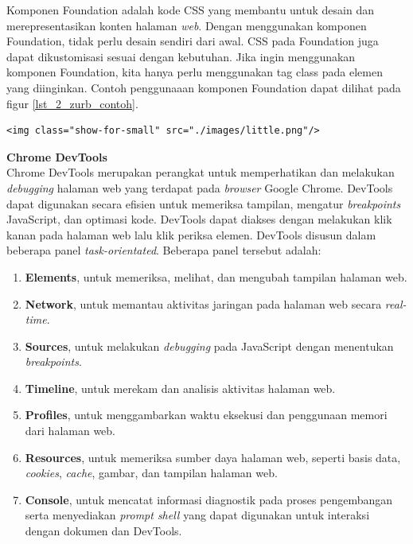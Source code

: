 \documentclass[a4paper,twoside]{article}
\begin{document}
\begin{enumerate}
Komponen Foundation adalah kode CSS  yang membantu untuk desain dan merepresentasikan konten halaman \textit{web}. Dengan menggunakan komponen Foundation, tidak perlu desain sendiri dari awal. CSS pada Foundation juga dapat dikustomisasi sesuai dengan kebutuhan. Jika ingin menggunakan komponen Foundation, kita hanya perlu menggunakan tag class pada elemen yang diinginkan. Contoh penggunaaan komponen Foundation dapat dilihat pada figur \ref{lst_2_zurb_contoh}.

\begin{lstlisting}[caption=Menggunakan kelas yang sudah disediakan dari Foundation,label = {lst_2_zurb_contoh}]
	<img class="show-for-small" src="./images/little.png"/>
\end{lstlisting}

  \end{enumerate}

\textbf{Chrome DevTools}\\
Chrome DevTools\cite{devtools} merupakan perangkat untuk memperhatikan dan melakukan \textit{debugging} halaman web yang terdapat pada \textit{browser} Google Chrome. DevTools dapat digunakan secara efisien untuk memeriksa tampilan, mengatur \textit{breakpoints} JavaScript, dan optimasi kode. DevTools dapat diakses dengan melakukan klik kanan pada halaman web lalu klik periksa elemen. DevTools disusun dalam beberapa panel \textit{task-orientated}. Beberapa panel tersebut adalah:

\begin{enumerate}
	\item \textbf{Elements}, untuk memeriksa, melihat, dan mengubah tampilan halaman web.
	\item \textbf{Network}, untuk memantau aktivitas jaringan pada halaman web secara \textit{real-time}.
	\item \textbf{Sources}, untuk melakukan \textit{debugging} pada JavaScript dengan menentukan \textit{breakpoints}.
	\item \textbf{Timeline}, untuk merekam dan analisis aktivitas halaman web.
	\item \textbf{Profiles}, untuk menggambarkan waktu eksekusi dan penggunaan memori dari halaman web.
	\item \textbf{Resources}, untuk memeriksa sumber daya halaman web, seperti basis data, \textit{cookies}, \textit{cache}, gambar, dan tampilan halaman web.
	\item \textbf{Console}, untuk mencatat informasi diagnostik pada proses pengembangan serta menyediakan \textit{prompt shell} yang dapat digunakan untuk interaksi dengan dokumen dan DevTools.
\end{enumerate}
\end{document}
